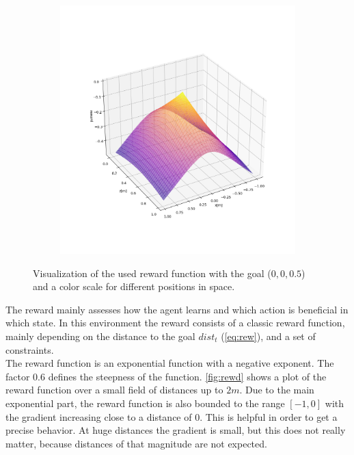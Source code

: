 \begin{figure}
\begin{subfigure}{0.32\linewidth}
		\caption{}
	\end{subfigure}
	\begin{subfigure}{0.32\linewidth}
		\includegraphics[width=\linewidth]{figures/rewXZ.png}
		\caption{}
	\end{subfigure}
	\caption{Visualization of the used reward function with the goal ($0,0,0.5$) and a color scale for different positions in space.}
	\label{fig:rewr}
\end{figure}
The reward mainly assesses how the agent learns and which action is beneficial in which state.
In this environment the reward consists of a classic reward function, mainly depending on the distance to the goal $dist_t$ (\cref{eq:rew}), and a set of constraints.\\
The reward function is an exponential function with a negative exponent. 
The factor $0.6$ defines the steepness of the function. \cref{fig:rewd} shows a plot of the reward function over a small field of distances up to $2m$. 
Due to the main exponential part, the reward function is also bounded to the range $[-1, 0]$ with the gradient increasing close to a distance of $0$. 
This is helpful in order to get a precise behavior. At huge distances the gradient is small, 
but this does not really matter, because distances of that magnitude are not expected.
